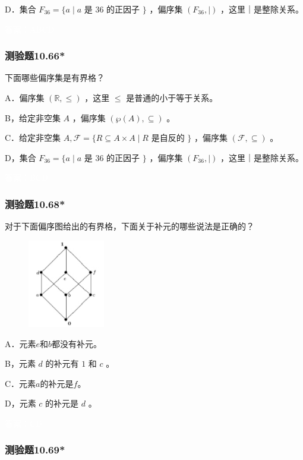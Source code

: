 \documentclass[UTF8, heading=true]{ctexart}
\begin{document}
D．集合 $F_{36}=\{a \mid a$ 是 36 的正因子 $\}$ ，偏序集 $\left(F_{36}, \mid\right)$ ，这里｜是整除关系。

\textcolor{white}{答案：ABCD}

\subsubsection{测验题10.66*}

下面哪些偏序集是有界格？

A．偏序集 $(\mathbb{R}, \leq)$ ，这里 $\leq$ 是普通的小于等于关系。

B，给定非空集 $A$ ，偏序集 $(\wp(A), \subseteq)$ 。

C．给定非空集 $A, \mathcal{F}=\{R \subseteq A \times A \mid R$ 是自反的 $\}$ ，偏序集 $(\mathcal{F}, \subseteq)$ 。

D，集合 $F_{36}=\{a \mid a$ 是 36 的正因子 $\}$ ，偏序集 $\left(F_{36}, \mid\right)$ ，这里｜是整除关系。

\textcolor{white}{答案：BCD}

\subsubsection{测验题10.68*}

对于下面偏序图给出的有界格，下面关于补元的哪些说法是正确的？

\begin{figure}[H]
  \centering
  \includegraphics[width=0.3\textwidth]{10.68.jpg} %
\end{figure}


A．元素$e$和$b$都没有补元。

B，元素 $d$ 的补元有 $1$ 和 $c$ 。

C．元素$a$的补元是$f$。

D，元素 $c$ 的补元是 $d$ 。

\textcolor{white}{答案：CD}

\subsubsection{测验题10.69*}
\end{document}
